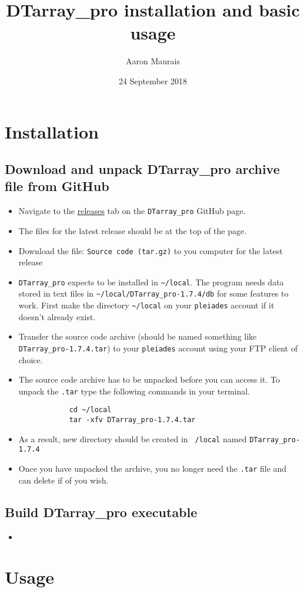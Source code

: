 \documentclass[12pt]{article}
\newcommand{\VERSION}{1.7.4}
\begin{document}
	
	\title{DTarray\_pro installation and basic usage}
	\author{Aaron Maurais}
	\date{24 September 2018}
	
	\maketitle
	\tableofcontents
	
	\section{Installation}
	
	\subsection{Download and unpack DTarray\_pro archive file from GitHub}
	\begin{itemize}
		\item Navigate to the \href{https://github.com/ajmaurais/DTarray_pro/releases}{releases} tab on the \texttt{DTarray\_pro} GitHub page.
		
		\item The files for the latest release should be at the top of the page.
		
		\item Download the file: \texttt{Source code (tar.gz)} to you computer for the latest release
		
		\item \texttt{DTarray\_pro} expects to be installed in \texttt{\textasciitilde/local}. The program needs data stored in text files in \texttt{\textasciitilde/local/DTarray\_pro-\VERSION/db} for some features to work. First make the directory \texttt{\textasciitilde/local} on your \texttt{pleiades} account if it doesn't already exist.
		
		\item Transfer the source code archive (should be named something like \texttt{DTarray\_pro-\VERSION.tar}) to your \texttt{pleiades} account using your FTP client of choice.	
		
		\item The source code archive has to be unpacked before you can access it. To unpack the \texttt{.tar} type the following commands in your terminal.
		
		\begin{lstlisting}
			cd ~/local
			tar -xfv DTarray_pro-1.7.4.tar
		\end{lstlisting}
		
		\item As a result, new directory should be created in \texttt{~/local} named \texttt{DTarray\_pro-\VERSION}
		
		\item Once you have unpacked the archive, you no longer need the \texttt{.tar} file and can delete if of you wish.
		
	\end{itemize}

	\subsection{Build DTarray\_pro executable}
	\begin{itemize}
		\item 
	\end{itemize}
	
	
	\section{Usage}
	
\end{document}
